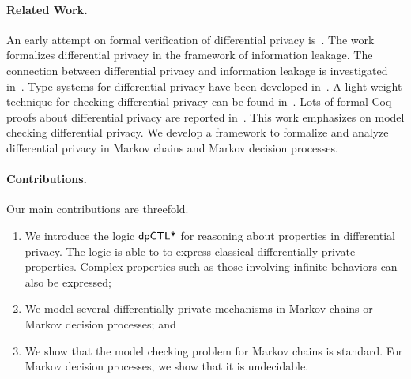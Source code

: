 \paragraph{Related Work.}
An early attempt on formal verification of differential privacy
is~\cite{TKD:11:FVDPIS}. The work formalizes differential privacy in
the framework of information leakage. The connection between
differential privacy and information leakage is investigated
in~\cite{AACDP:15:OILDPM,GMP:16:PDPFPS}. Type systems for differential
privacy have been developed
in~\cite{WHRP:17:FADP,GHHNP:13:LDPDP,RP:10:DMTGS}. A light-weight
technique for checking differential privacy can be found
in~\cite{ZK:17:LTADPP}. Lots of formal Coq proofs about differential
privacy are reported
in~\cite{BFGGHS:16:APCDP,BGGHS:16:PDPPC,BKOB:12:PRRDP,BDGKZ:13:VCDPASM,BGAHKS:14:PDPHL,BGAHRS:15:HOARRT,BFGAGHS:16:DPBP}. This
work emphasizes on model checking differential privacy. We develop a
framework to formalize and analyze differential privacy in Markov
chains and Markov decision processes.

\noindent
\paragraph{Contributions.} Our main contributions are threefold. 
\begin{enumerate}
\item We introduce the logic $\textsf{dpCTL*}$ for reasoning about properties in
differential privacy. The logic is able to to express classical
differentially private properties. Complex properties such as those
involving infinite behaviors can also be expressed;
\item We model several differentially private mechanisms in Markov chains or Markov decision processes; and
\item We show that the model checking
problem for Markov chains is standard. For Markov decision processes, we show that it is undecidable.
\end{enumerate}
